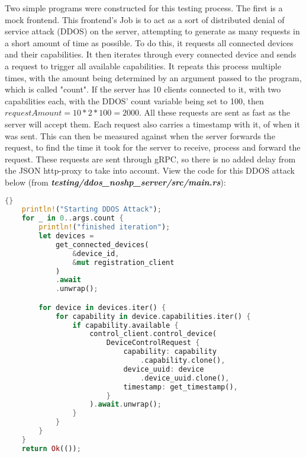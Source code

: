 Two simple programs were constructed for this testing process. The first is a mock frontend. This frontend's Job is to act as a sort of distributed denial of service attack (DDOS) on the server, attempting to generate as many requests in a short amount of time as possible. To do this, it requests all connected devices and their capabilities. It then iterates through every connected device and sends a request to trigger all available capabilities. It repeats this process multiple times, with the amount being determined by an argument passed to the program, which is called "count". If the server has 10 clients connected to it, with two capabilities each, with the DDOS' count variable being set to 100, then \(requestAmount = 10 * 2 * 100 = 2000\). All these requests are sent as fast as the server will accept them. Each request also carries a timestamp with it, of when it was sent. This can then be measured against when the server forwards the request, to find the time it took for the server to receive, process and forward the request. These requests are sent through gRPC, so there is no added delay from the JSON http-proxy to take into account. View the code for this DDOS attack below (from \textit{\textbf{testing/ddos\_noshp\_server/src/main.rs}}):
\begin{lstlisting}[language=Rust, style=boxed, showstringspaces=false]{}
    println!("Starting DDOS Attack");
    for _ in 0..args.count {
        println!("finished iteration");
        let devices = 
            get_connected_devices(
                &device_id, 
                &mut registration_client
            )
            .await
            .unwrap();

        for device in devices.iter() {
            for capability in device.capabilities.iter() {
                if capability.available {
                    control_client.control_device(
                        DeviceControlRequest {
                            capability: capability
                                .capability.clone(),
                            device_uuid: device
                                .device_uuid.clone(),
                            timestamp: get_timestamp(),
                        }
                    ).await.unwrap();
                }
            }
        }
    }
    return Ok(());
\end{lstlisting}

